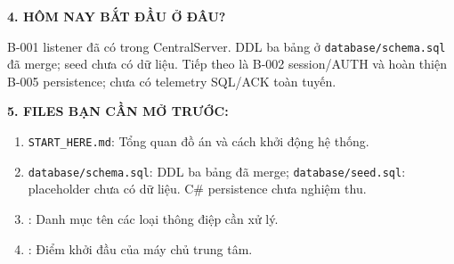 \documentclass[12pt,a4paper]{article}
\begin{document}
\begin{tcolorbox}[enhanced, colback=lgLightGreen, colframe=lgForestGreen, boxrule=0.8pt, arc=1.5mm, top=1.8mm, bottom=1.8mm, left=2.5mm, right=2.5mm]
{\bfseries\color{lgForestGreen} 4. HÔM NAY BẮT ĐẦU Ở ĐÂU?}\par
\vspace{0.5mm}
B-001 listener đã có trong CentralServer. DDL ba bảng ở \texttt{database/schema.sql} đã merge; seed chưa có dữ liệu. Tiếp theo là B-002 session/AUTH và hoàn thiện B-005 persistence; chưa có telemetry SQL/ACK toàn tuyến.
\end{tcolorbox}
\vspace{1.5mm}

\begin{tcolorbox}[enhanced, colback=lgLightSlate, colframe=lgSlate, boxrule=0.8pt, arc=1.5mm, top=1.8mm, bottom=1.8mm, left=2.5mm, right=2.5mm]
{\bfseries\color{lgSlate} 5. FILES BẠN CẦN MỞ TRƯỚC:}\par
\vspace{0.5mm}
\begin{enumerate}[leftmargin=1.5em, itemsep=0.5pt, parsep=0pt, topsep=1pt]
  \item \texttt{START\_HERE.md}: Tổng quan đồ án và cách khởi động hệ thống.
  \item \texttt{database/schema.sql}: DDL ba bảng đã merge; \texttt{database/seed.sql}: placeholder chưa có dữ liệu. C\# persistence chưa nghiệm thu.
  \item {}: Danh mục tên các loại thông điệp cần xử lý.
  \item {}: Điểm khởi đầu của máy chủ trung tâm.
\end{enumerate}
\end{tcolorbox}

\newpage

\setcounter{page}{3}

\setcounter{tocdepth}{2}
\renewcommand{\contentsname}{MỤC LỤC}
\tableofcontents
\newpage

\setcounter{page}{1}


\end{document}

